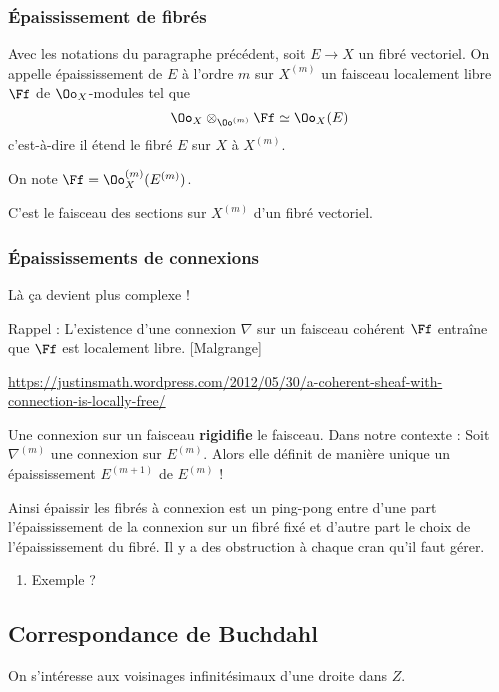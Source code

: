 \documentclass[a4paper]{amsart}
\begin{document}
\subsubsection{Épaississement de fibrés}
\label{sec:orgheadline5}

Avec les notations du paragraphe précédent, soit \(E \to X\) un fibré vectoriel. On appelle épaississement de \(E\) à l’ordre \(m\) sur \(X^{(m)}\) un faisceau localement libre \(\Ff\) de \(\Oo_X\)-modules tel que
\[
\Oo_X \otimes_{\Oo^{(m)}} \Ff \simeq \Oo_X(E)
\]
c’est-à-dire il étend le fibré \(E\) sur \(X\) à \(X^{(m)}\).

On note \(\Ff = \Oo_X^{(m)}(E^{(m)})\).

C'est le faisceau des sections sur \(X^{(m)}\) d'un fibré vectoriel.


\subsubsection{Épaississements de connexions}
\label{sec:orgheadline7}
Là ça devient plus complexe !

Rappel : L'existence d'une connexion \(\nabla\) sur un faisceau cohérent \(\Ff\) entraîne que \(\Ff\) est localement libre. [Malgrange]

\url{https://justinsmath.wordpress.com/2012/05/30/a-coherent-sheaf-with-connection-is-locally-free/}

Une connexion sur un faisceau \textbf{rigidifie} le faisceau. Dans notre contexte : Soit \(\nabla^{(m)}\) une connexion sur \(E^{(m)}\). Alors elle définit de manière unique un épaississement \(E^{(m+1)}\) de \(E^{(m)}\) !

Ainsi épaissir les fibrés à connexion est un ping-pong entre d’une part l’épaississement de la connexion sur un fibré fixé et d’autre part le choix de l’épaississement du fibré. Il y a des obstruction à chaque cran qu'il faut gérer.

\begin{enumerate}
\item Exemple ?
\label{sec:orgheadline6}
\end{enumerate}



\subsection{Correspondance de Buchdahl}
\label{sec:orgheadline14}

On s'intéresse aux voisinages infinitésimaux d'une droite dans \(Z\). 
\end{document}
